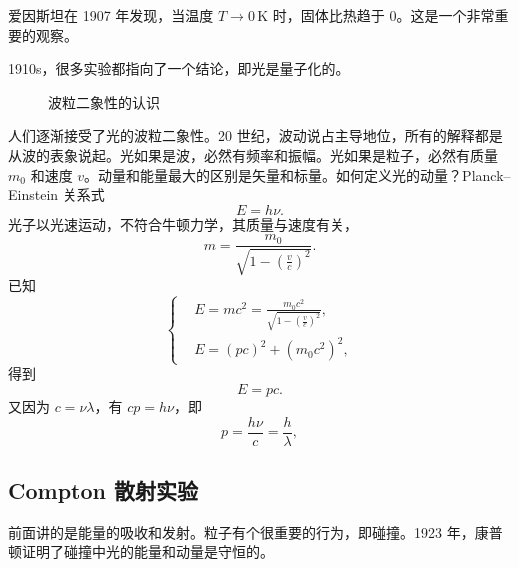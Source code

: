 爱因斯坦在 1907 年发现，当温度 $T \rightarrow 0\,\mathrm{K}$ 时，固体比热趋于 0。这是一个非常重要的观察。

1910s，很多实验都指向了一个结论，即光是量子化的。

\begin{figure}\centering
{}
\caption{波粒二象性的认识}
\end{figure}

人们逐渐接受了光的波粒二象性。20 世纪，波动说占主导地位，所有的解释都是从波的表象说起。光如果是波，必然有频率和振幅。光如果是粒子，必然有质量 $m_0$ 和速度 $v$。动量和能量最大的区别是矢量和标量。如何定义光的动量？Planck--Einstein 关系式
\begin{equation}
    E = h\nu. 
\end{equation}
光子以光速运动，不符合牛顿力学，其质量与速度有关，
\begin{equation}
    m = \frac{m_0}{\sqrt{1 - \left(\frac vc\right)^2}}.
\end{equation}
已知
\begin{equation}
    \left\{
        \begin{aligned}
        &E = mc^2 = \frac{m_0c^2}{\sqrt{1 - \left(\frac vc\right)^2}}, \\
        &E = (pc)^2 + (m_0c^2)^2, 
        \end{aligned}
    \right.
\end{equation}
得到
\begin{equation}
    E = pc.
\end{equation}
又因为 $c = \nu\lambda$，有 $cp = h\nu$，即
\begin{equation}
    p = \frac{h\nu}c = \frac h\lambda,
\end{equation}

\subsection{Compton 散射实验}
前面讲的是能量的吸收和发射。粒子有个很重要的行为，即碰撞。1923 年，康普顿证明了碰撞中光的能量和动量是守恒的。

